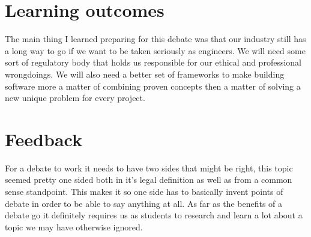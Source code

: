 \documentclass{article}
\begin{document}
\title{}
\date{}
\author{Barry Warnock}
\maketitle

\section*{Learning outcomes}
The main thing I learned preparing for this debate was that our industry still has a long way to go if we want to be taken seriously as
engineers. We will need some sort of regulatory body that holds us responsible for our ethical and professional wrongdoings. We will
also need a better set of frameworks to make building software more a matter of combining proven concepts then a matter of solving
a new unique problem for every project.

\section*{Feedback}
For a debate to work it needs to have two sides that might be right, this topic seemed pretty one sided both in it's legal definition as well
as from a common sense standpoint. This makes it so one side has to basically invent points of debate in order to be able to say anything at all.
As far as the benefits of a debate go it definitely requires us as students to research and learn a lot about a topic we may have otherwise ignored.
\end{document}
